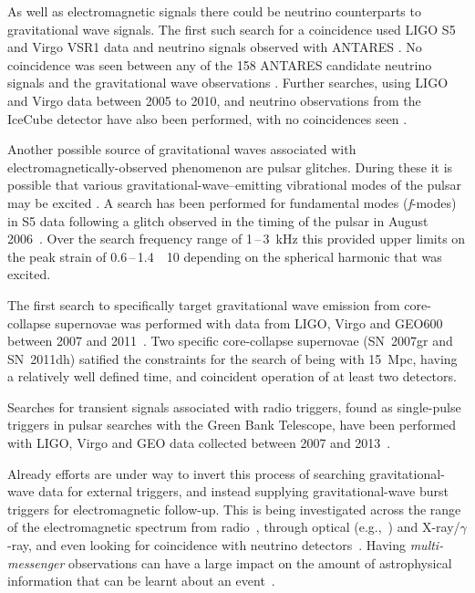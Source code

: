 As well as electromagnetic signals there could be neutrino counterparts to gravitational wave signals. The 
first such search for a coincidence used LIGO S5 and Virgo VSR1 data and neutrino signals observed with 
ANTARES \cite{2011NIMPA.656...11A}. No coincidence was seen between any of the 158 ANTARES candidate neutrino 
signals and the gravitational wave observations \cite{2013JCAP...06..008A}. Further searches, using LIGO and 
Virgo data between 2005 to 2010, and neutrino observations from the IceCube detector 
\cite{2014PhRvD..90j2002A} have also been performed, with no coincidences seen \cite{2014PhRvD..90j2002A}.

Another possible source of gravitational waves associated with electromagnetically-observed phenomenon are 
pulsar glitches. During these it is possible that various gravitational-wave--emitting vibrational modes of 
the pulsar may be excited \cite{1998MNRAS.299.1059A}. A search has been performed for fundamental modes 
(\textit{f}-modes) in S5 data following a glitch observed in the timing of the  pulsar in 
August 2006~\cite{Abadie:2010a}. Over the search frequency range of 1\,--\,3~kHz this provided upper limits 
on the peak strain of 0.6\,--\,1.4~\texttimes~10 depending on the spherical harmonic that was 
excited.

The first search to specifically target gravitational wave emission from core-collapse supernovae was 
performed with data from LIGO, Virgo and GEO600 between 2007 and 2011~\cite{2016arXiv160501785A}. Two 
specific core-collapse supernovae (SN~2007gr and SN~2011dh) satified the constraints for the search of being 
with 15~Mpc, having a relatively well defined time, and coincident operation of at least two detectors.

Searches for transient signals associated with radio triggers, found as single-pulse triggers in pulsar 
searches with the Green Bank Telescope, have been performed with LIGO, Virgo and GEO data collected between 
2007 and 2013~\cite{2016PhRvD..93l2008A}.

Already efforts are under way to invert this process of searching gravitational-wave data for external 
triggers, and instead supplying gravitational-wave burst triggers for electromagnetic follow-up. This is 
being investigated across the range of the electromagnetic spectrum from radio~\cite{Predoi:2010}, through
optical (e.g.,~\cite{Kanner:2008, Coward:2010}) and X-ray/$\gamma$-ray, and even looking for coincidence with 
neutrino detectors~\cite{Aso:2008, Pradier:2010, Chassande:2010}. Having \textit{multi-messenger} 
observations can have a large impact on the amount of astrophysical information that can be learnt about
an event~\cite{Phinney:2009}.

